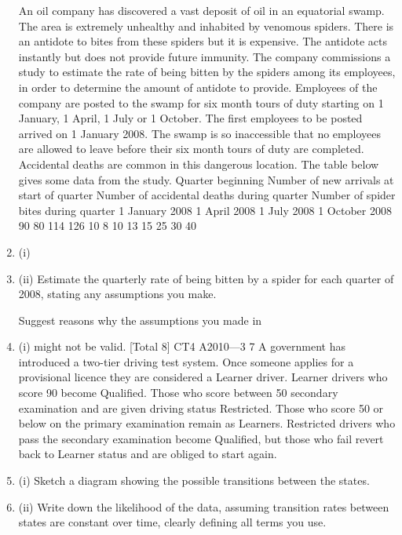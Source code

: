 \documentclass[a4paper,12pt]{article}
\begin{document}
\begin{enumerate}

 
An oil company has discovered a vast deposit of oil in an equatorial swamp.
The area is extremely unhealthy and inhabited by venomous spiders. There is
an antidote to bites from these spiders but it is expensive. The antidote acts
instantly but does not provide future immunity. The company commissions a
study to estimate the rate of being bitten by the spiders among its employees, in
order to determine the amount of antidote to provide.
Employees of the company are posted to the swamp for six month tours of duty
starting on 1 January, 1 April, 1 July or 1 October. The first employees to be posted
arrived on 1 January 2008. The swamp is so inaccessible that no employees are
allowed to leave before their six month tours of duty are completed.
Accidental deaths are common in this dangerous location.
The table below gives some data from the study.
Quarter
beginning Number of new
arrivals at start
of quarter Number of
accidental deaths
during quarter Number of
spider bites
during quarter
1 January 2008
1 April 2008
1 July 2008
1 October 2008 90
80
114
126 10
8
10
13 15
25
30
40
\item (i)
\item (ii)
Estimate the quarterly rate of being bitten by a spider for each quarter of
2008, stating any assumptions you make.
 
Suggest reasons why the assumptions you made in \item (i) might not be valid.  
[Total 8]
CT4 A2010—3
7
A government has introduced a two-tier driving test system. Once someone applies
for a provisional licence they are considered a Learner driver. Learner drivers who
score 90%
become Qualified. Those who score between 50%
secondary examination and are given driving status Restricted. Those who score 50%
or below on the primary examination remain as Learners. Restricted drivers who pass
the secondary examination become Qualified, but those who fail revert back to
Learner status and are obliged to start again.
\item (i) Sketch a diagram showing the possible transitions between the states.
 
\item (ii) Write down the likelihood of the data, assuming transition rates between states
are constant over time, clearly defining all terms you use.
 

\end{enumerate}
\end{document}

